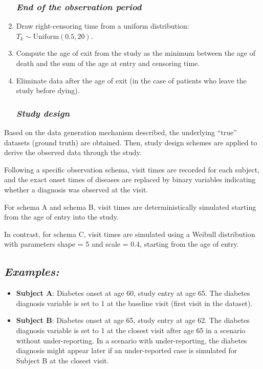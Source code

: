 \documentclass[
]{article}
\begin{document}
\begin{enumerate}
  \hypertarget{end-of-the-observation-period}{%
  \subsubsection{\texorpdfstring{\textbf{\emph{End of the observation
  period}}}{End of the observation period}}\label{end-of-the-observation-period}}
\item
  Draw right-censoring time from a uniform distribution:\\
  \(T_k \sim \text{Uniform}(0.5, 20)\).
\item
  Compute the age of exit from the study as the minimum between the age
  of death and the sum of the age at entry and censoring time.
\item
  Eliminate data after the age of exit (in the case of patients who
  leave the study before dying).

  \hypertarget{study-design}{%
  \subsubsection{\texorpdfstring{\textbf{\emph{Study
  design}}}{Study design}}\label{study-design}}
\end{enumerate}

Based on the data generation mechanism described, the underlying
``true'' datasets (ground truth) are obtained. Then, study design
schemes are applied to derive the observed data through the study.

Following a specific observation schema, visit times are recorded for
each subject, and the exact onset times of diseases are replaced by
binary variables indicating whether a diagnosis was observed at the
visit.

For schema A and schema B, visit times are deterministically simulated
starting from the age of entry into the study.

In contrast, for schema C, visit times are simulated using a Weibull
distribution with parameters shape = 5 and scale = 0.4, starting from
the age of entry.

\hypertarget{examples}{%
\subsection{\texorpdfstring{\textbf{\emph{Examples:}}}{Examples:}}\label{examples}}

\begin{itemize}
\item
  \textbf{Subject A}: Diabetes onset at age 60, study entry at age 65.
  The diabetes diagnosis variable is set to 1 at the baseline visit
  (first visit in the dataset).
\item
  \textbf{Subject B}: Diabetes onset at age 65, study entry at age 62.
  The diabetes diagnosis variable is set to 1 at the closest visit after
  age 65 in a scenario without under-reporting. In a scenario with
  under-reporting, the diabetes diagnosis might appear later if an
  under-reported case is simulated for Subject B at the closest visit.
\end{itemize}
\end{document}
